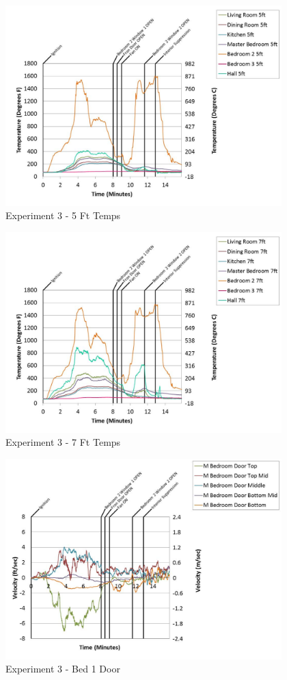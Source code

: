\documentclass{article}
\begin{document}
\begin{appendices}
	\begin{figure}[h!]
		\centering
		\includegraphics[height=3.05in]{0_Images/Results_Charts/Exp_3_Charts/5FtTemps.pdf}
		\caption{Experiment 3 - 5 Ft Temps}
	\end{figure}
 

	\begin{figure}[h!]
		\centering
		\includegraphics[height=3.05in]{0_Images/Results_Charts/Exp_3_Charts/7FtTemps.pdf}
		\caption{Experiment 3 - 7 Ft Temps}
	\end{figure}
 
	\clearpage

	\begin{figure}[h!]
		\centering
		\includegraphics[height=3.05in]{0_Images/Results_Charts/Exp_3_Charts/Bed1Door.pdf}
		\caption{Experiment 3 - Bed 1 Door}
	\end{figure}
 


\end{appendices}
\end{document}
